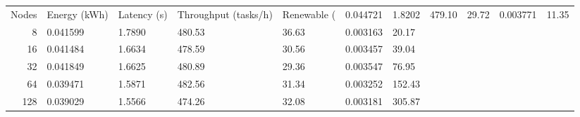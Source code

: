\begin{tabular}{rllllll}
\toprule
Nodes & Energy (kWh) & Latency (s) & Throughput (tasks/h) & Renewable (%
 & 0.044721 & 1.8202 & 479.10 & 29.72 & 0.003771 & 11.35 \\
8 & 0.041599 & 1.7890 & 480.53 & 36.63 & 0.003163 & 20.17 \\
16 & 0.041484 & 1.6634 & 478.59 & 30.56 & 0.003457 & 39.04 \\
32 & 0.041849 & 1.6625 & 480.89 & 29.36 & 0.003547 & 76.95 \\
64 & 0.039471 & 1.5871 & 482.56 & 31.34 & 0.003252 & 152.43 \\
128 & 0.039029 & 1.5566 & 474.26 & 32.08 & 0.003181 & 305.87 \\
\bottomrule
\end{tabular}
